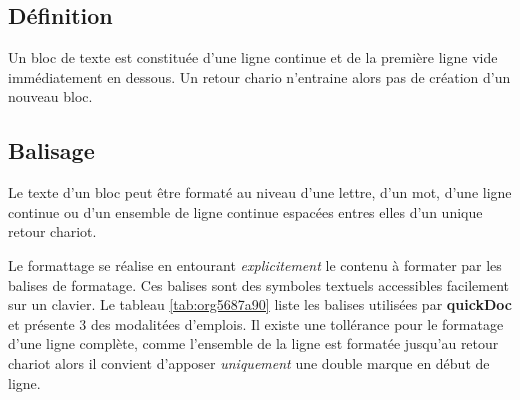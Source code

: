 \documentclass[a4paper,12pt]{article}
\begin{document}
\subsection{Définition}
\label{sec:orgd58cfb7}
Un bloc de texte est constituée d'une ligne continue et de la première ligne vide immédiatement en dessous. Un retour chario n'entraine alors pas de création d'un nouveau bloc.
\subsection{Balisage}
\label{sec:orgdfd852b}
Le texte d'un bloc peut être formaté au niveau d'une lettre, d'un mot, d'une ligne continue ou d'un ensemble de ligne continue espacées entres elles d'un unique retour chariot.

Le formattage se réalise en entourant \emph{explicitement} le contenu à formater par les balises de formatage. Ces balises sont des symboles textuels accessibles facilement sur un clavier. Le tableau \ref{tab:org5687a90} liste les balises utilisées par \textbf{quickDoc} et présente 3 des modalitées d'emplois. Il existe une tollérance pour le formatage d'une ligne complète, comme l'ensemble de la ligne est formatée jusqu'au retour chariot alors il convient d'apposer \emph{uniquement} une double marque en début de ligne.  
\end{document}
